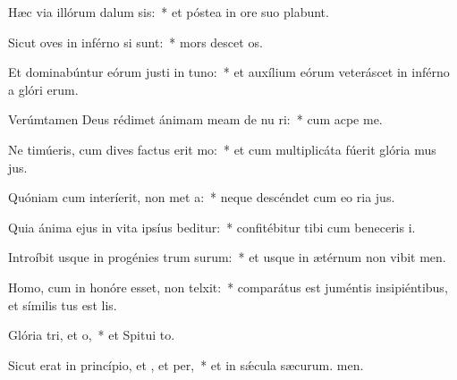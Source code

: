 \item Hæc via illórum dalum sis:~* et póstea in ore suo plabunt.
\item Sicut oves in inférno si sunt:~* mors descet os.
\item Et dominabúntur eórum justi in tuno:~* et auxílium eórum veteráscet in inférno a glóri erum.
\item Verúmtamen Deus rédimet ánimam meam de nu ri:~* cum acpe me.
\item Ne timúeris, cum dives factus erit mo:~* et cum multiplicáta fúerit glória mus jus.
\item Quóniam cum interíerit, non met a:~* neque descéndet cum eo ria jus.
\item Quia ánima ejus in vita ipsíus beditur:~* confitébitur tibi cum beneceris i.
\item Introíbit usque in progénies trum surum:~* et usque in ætérnum non vibit men.
\item Homo, cum in honóre esset, non telxit:~* comparátus est juméntis insipiéntibus, et símilis tus est lis.
\item Glória tri, et o,~* et Spitui to.
\item Sicut erat in princípio, et , et per,~* et in sǽcula sæcurum. men.
